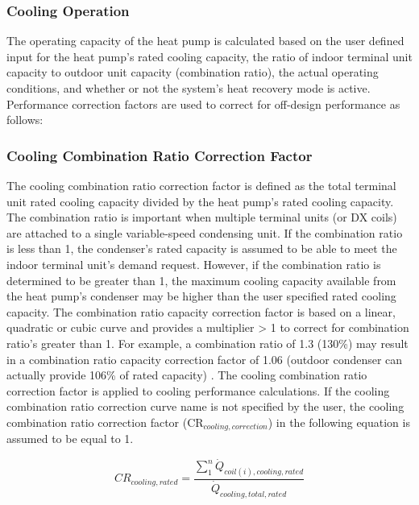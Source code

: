 \subsubsection{Cooling Operation}\label{cooling-operation-000}

The operating capacity of the heat pump is calculated based on the user defined input for the heat pump's rated cooling capacity, the ratio of indoor terminal unit capacity to outdoor unit capacity (combination ratio), the actual operating conditions, and whether or not the system's heat recovery mode is active. Performance correction factors are used to correct for off-design performance as follows:

\subsubsection{Cooling Combination Ratio Correction Factor}\label{cooling-combination-ratio-correction-factor}

The cooling combination ratio correction factor is defined as the total terminal unit rated cooling capacity divided by the heat pump's rated cooling capacity. The combination ratio is important when multiple terminal units (or DX coils) are attached to a single variable-speed condensing unit. If the combination ratio is less than 1, the condenser's rated capacity is assumed to be able to meet the indoor terminal unit's demand request. However, if the combination ratio is determined to be greater than 1, the maximum cooling capacity available from the heat pump's condenser may be higher than the user specified rated cooling capacity. The combination ratio capacity correction factor is based on a linear, quadratic or cubic curve and provides a multiplier \textgreater{} 1 to correct for combination ratio's greater than 1. For example, a combination ratio of 1.3 (130\%) may result in a combination ratio capacity correction factor of 1.06 (outdoor condenser can actually provide 106\% of rated capacity) . The cooling combination ratio correction factor is applied to cooling performance calculations. If the cooling combination ratio correction curve name is not specified by the user, the cooling combination ratio correction factor (CR\(_{cooling,correction}\)) in the following equation is assumed to be equal to 1.

\begin{equation}
  CR_{cooling,rated} = \frac{\sum \limits_1^n \dot{Q}_{coil(i),cooling,rated}}{\dot{Q}_{cooling,total,rated}}
\end{equation}

